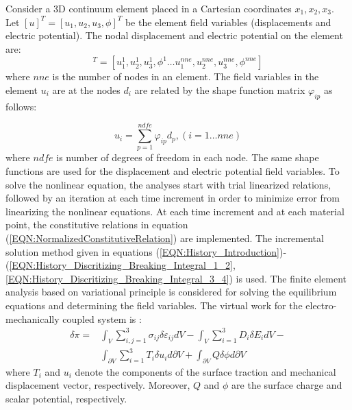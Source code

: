 Consider a 3D continuum element placed in a Cartesian coordinates $x_1, x_2, x_3$. 
Let $[u]^T=[u_1,u_2,u_3,\phi]^T$ be the element field variables (displacements and electric potential). 
The nodal displacement and electric potential on the element are:
\begin{equation}
[d]^T=[u_1^1,u_2^1,u_3^1,\phi^1 \dots u_1^{nne},u_2^{nne},u_3^{nne},\phi^{nne}]
\label{EQN:dof_vector_structure}
\end{equation}
where $nne$ is the number of nodes in an element.
The field variables in the element $u_i$ are at the nodes $d_i$ are related by the shape function matrix $\varphi_{ip}$ as follows:

\begin{equation}
u_i=
\sum _{p=1}^{ndfe} \varphi_{ip} d_p,(i=1\dots nne)
\label{EQN:DispShapeDof}
\end{equation}
where $ndfe$ is number of degrees of freedom in each node.
The same shape functions are used for the displacement and electric potential field variables. 
To solve the nonlinear equation, the analyses start with trial linearized relations, followed by an iteration at each time increment 
in order to minimize error from linearizing the nonlinear equations.
At each time increment and at each material point, the constitutive relations in equation (\ref{EQN:NormalizedConstitutiveRelation}) are implemented. 
The incremental solution method given in equations (\ref{EQN:History_Introduction})-(\ref{EQN:History_Discritizing_Breaking_Integral_1_2}, \ref{EQN:History_Discritizing_Breaking_Integral_3_4}) is used.
The finite element analysis based on variational principle is considered for solving the equilibrium equations and determining the field variables.
The virtual work for the  electro-mechanically coupled system is \cite{Benjeddou2000,tiersten1993electroelastic}:
\begin{equation} 
\begin{aligned}
\delta \pi= 
& \int_V 
\sum_{i,j=1}^3 \sigma_{ij}\delta \varepsilon_{ij} dV -
\int_V 
\sum_{i=1}^3 D_{i}\delta E_{i} dV- \\
&\int_{\partial V}
\sum_{i=1}^3 T_{i}\delta u_{i} d{\partial V}+
\int_{\partial V} 
Q\delta \phi d{\partial V}
\label{EQN:Variation_of_Energy}
\end{aligned}
\end{equation}
where $T_{i}$ and $u_{i}$ denote the components of the surface traction and mechanical displacement vector, respectively.
Moreover, $Q$ and $\phi$ are the surface charge and scalar potential, respectively.
